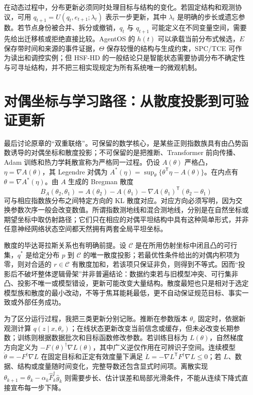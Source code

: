 在动态过程中，分布更新必须同时处理目标与结构的变化。若固定结构和观测协议，可用 $q_{t+1}=U(q_t,e_{t+1};\lambda_t)$ 表示一步更新，其中 $\lambda_t$ 是明确的步长或遗忘参数。若节点身份被合并、拆分或撤销，$q_t$ 与 $q_{t+1}$ 可能定义在不同变量空间，需要先给出迁移核或拒绝直接比较。AgentOS 的 $h(t)$ 可以承载当前分布式候选，$E$ 保存带时间和来源的事件证据，$\Theta$ 保存较慢的结构与生成约束，SPC/TCE 可作为读出和调控实例；但 HSF-HD 的一般结论只是智能状态需要协调分布不确定性与可寻址结构，并不把三相实现规定为所有系统唯一的微观机制。

\section{对偶坐标与学习路径：从散度投影到可验证更新}
\label{sec:dual_connections_learning_and_perception}

最后讨论原章的“双重联络”。可保留的数学核心，是某些正则指数族具有由凸势函数诱导的对偶坐标和散度投影；不可保留的是把推断、Transformer 前向传播、Adam 训练和热力学耗散宣称为严格同一过程。仍设 $A(\theta)$ 严格凸，$\eta=\nabla A(\theta)$，其 Legendre 对偶为 $A^*(\eta)=\sup_\theta\{\theta^{\mathsf T}\eta-A(\theta)\}$。在内点有 $\theta=\nabla A^*(\eta)$。由 $A$ 生成的 Bregman 散度
\begin{equation}
    B_A(\theta_2,\theta_1)
    =A(\theta_2)-A(\theta_1)-\nabla A(\theta_1)^{\mathsf T}(\theta_2-\theta_1)
\end{equation}
可与相应指数族分布之间特定方向的 KL 散度对应。对应方向必须写明，因为交换参数次序一般会改变数值。所谓指数测地线和混合测地线，分别是在自然坐标或期望坐标中取仿射路径；它们只在相应的对偶平坦结构中具有这种简单形式，并非任意神经网络状态空间都天然拥有两套全局平坦坐标。

散度的毕达哥拉斯关系也有明确前提。设 $\mathcal C$ 是在所用仿射坐标中闭且凸的可行集，$q^*$ 是给定分布 $p$ 到 $\mathcal C$ 的唯一散度投影；若最优性条件给出的对偶内积项为零，则对合适的 $r\in\mathcal C$ 有散度加和，若该项只保证非负，则得到不等式。因而“投影后不破坏整体逻辑骨架”并非普遍结论：数据约束若与旧模型冲突、可行集非凸、投影不唯一或模型错设，更新可能改变大量结构。散度最短也只是相对于选定模型族和散度的最小改动，不等于焦耳能耗最低，更不自动保证规范目标、事实一致或外部任务成功。

为了区分运行过程，我把三类更新分别记账。推断在参数版本 $\theta_v$ 固定时，依据新观测计算 $q(z\mid x,\theta_v)$；在线状态更新改变当前信念或缓存，但未必改变长期参数；训练则根据数据批次和目标函数修改参数。若训练目标为 $L(\theta)$，自然梯度方向定义为 $-F(\theta)^{\dagger}\nabla L(\theta)$，其中广义逆仅作用在可辨识子空间。连续模型 $\dot\theta=-F^{\dagger}\nabla L$ 在固定目标和正定有效度量下满足 $\dot L=-\nabla L^{\mathsf T}F^{\dagger}\nabla L\leq0$；若 $L$、数据、结构或度量随时间变化，完整导数还包含显式时间项。离散实现 $\theta_{k+1}=\theta_k-\alpha_k\widehat F_k^{\dagger}\widehat g_k$ 则需要步长、估计误差和局部光滑条件，不能从连续下降式直接宣布每一步下降。


